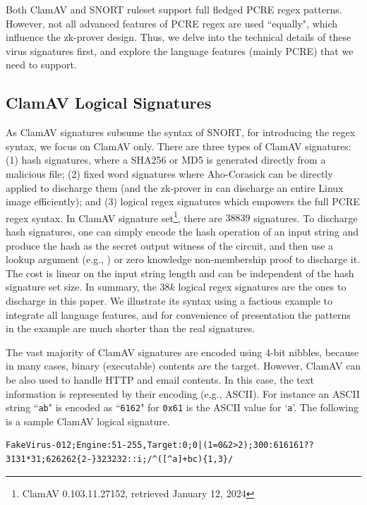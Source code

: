 Both ClamAV and SNORT ruleset support full fledged
PCRE regex patterns. However, not all advanced features of
PCRE regex are used ``equally", which influence the zk-prover design.
Thus, we delve into the technical details of these virus
signatures first, and explore the language features (mainly PCRE)
that we need to support.


\subsection{ClamAV Logical Signatures}
As ClamAV signatures subsume the syntax of SNORT, for introducing
the regex syntax, we focus on
ClamAV only. There are three types of ClamAV signatures: (1) hash 
signatures, where a SHA256 or MD5 is generated directly from a malicious
file; (2) fixed word signatures where Aho-Corasick can be directly
applied to discharge them (and the zk-prover in \cite{Zkreg}
can discharge an entire Linux image efficiently); and (3)
logical regex signatures which empowers the full PCRE regex
syntax. In ClamAV signature set\footnote{ClamAV 0.103.11.27152, retrieved
January 12, 2024}, there are $38839$ signatures. To discharge hash
signatures, one can simply encode the hash operation of an input string
and produce the hash as the secret output witness of the circuit,
and then use a lookup argument (e.g., \cite{Caulk22,CaulkPlus,Baloo,cq})
or zero knowledge non-membership proof to discharge it. The cost is
linear on the input string length and can be independent of the
hash signature set size. In summary, the $38k$ 
logical regex signatures are the ones to discharge in this paper.
We illustrate its syntax using a factious example to integrate
all language features, and for convenience of presentation the 
patterns in the example are much shorter than the real 
signatures.


\begin{example} \label{examp:fake012}
The vast majority of ClamAV signatures are encoded using
4-bit nibbles, because in many cases, binary (executable) contents
are the target. However, ClamAV can be also used to handle HTTP and
email contents. In this case, the text information is represented by
their encoding (e.g., ASCII). For instance an ASCII string
``\texttt{ab}" is encoded as ``\texttt{6162}" for \texttt{0x61} is
the ASCII value for `\texttt{a}'.
The following is a sample ClamAV logical signature.

\begin{small}
\begin{Verbatim}[breaklines=true, breakanywhere=true]
FakeVirus-012;Engine:51-255,Target:0;0|(1=0&2>2);300:616161??3131*31;626262{2-}323232::i;/^([^a]+bc){1,3}/
\end{Verbatim}
\end{small}
\end{example}

